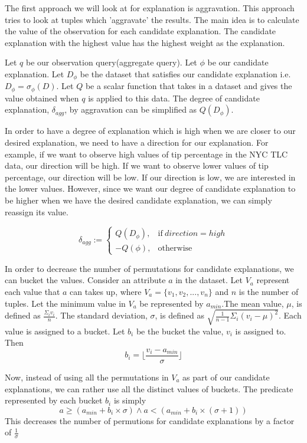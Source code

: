 The first approach we will look at for explanation is aggravation. This approach tries to look at tuples which 'aggravate' the results. The main idea is to calculate the value of the observation for each candidate explanation. The candidate explanation with the highest value has the highest weight as the explanation.

Let $q$ be our observation query(aggregate query). Let $\phi$ be our candidate explanation. Let $D_\phi$ be the dataset that satisfies our candidate explanation i.e. $D_\phi = \sigma_\phi(D)$. Let $Q$ be a scalar function that takes in a dataset and gives the value obtained when $q$ is applied to this data. The degree of candidate explanation, $\delta_{agg}$, by aggravation can be simplified as $Q(D_\phi)$.

In order to have a degree of explanation which is high when we are closer to our desired explanation, we need to have a direction for our explanation. For example, if we want to observe high values of tip percentage in the NYC TLC data, our direction will be high. If we want to observe lower values of tip percentage, our direction will be low. If our direction is low, we are interested in the lower values. However, since we want our degree of candidate explanation to be higher when we have the desired candidate explanation, we can simply reassign its value.

\begin{equation}
\delta_{agg}:=
    \begin{cases}
      Q(D_\phi), & \text{if}\ direction=high \\
      -Q(\phi), & \text{otherwise}
    \end{cases}
\end{equation}

In order to decrease the number of permutations for candidate explanations, we can bucket the values. Consider an attribute $a$ in the dataset. Let $V_a$ represent each value that $a$ can takes up, where $V_a=\{v_1,v_2,...,v_n\}$ and $n$ is the number of tuples. Let the minimum value in $V_a$ be represented by $a_{min}$.The mean value, $\mu$, is defined as $\frac{\Sigma_iv_i}{n}$. The standard deviation, $\sigma$, is defined as $\sqrt{\frac{1}{n-1}\Sigma_i(v_i-\mu)^2}$. Each value is assigned to a bucket. Let $b_i$ be the bucket the value, $v_i$ is assigned to. Then $$b_i = \bigg \lfloor\frac{v_i-a_{min}}{\sigma} \bigg \rfloor$$

Now, instead of using all the permutations in $V_a$ as part of our candidate explanations, we can rather use all the distinct values of buckets. The predicate represented by each bucket $b_i$ is simply
$$ a \geq (a_{min}+b_i\times\sigma) \wedge a < (a_{min}+b_i\times(\sigma+1))$$
This decreases the number of permutions for candidate explanations by a factor of $\frac{1}{\sigma}$

